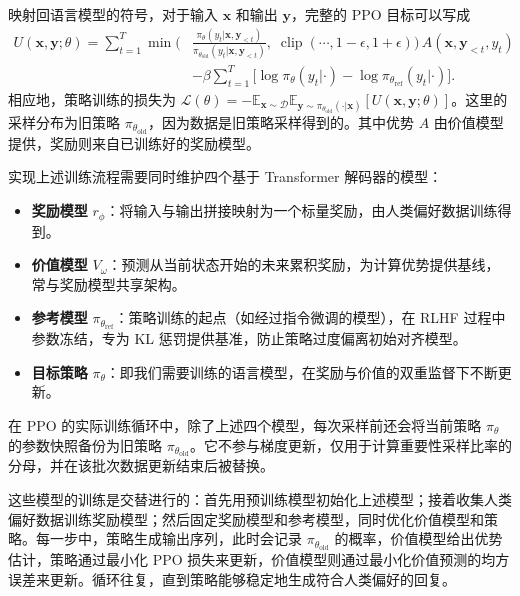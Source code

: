 \documentclass{article}
\begin{document}
映射回语言模型的符号，对于输入 \(\mathbf{x}\) 和输出 \(\mathbf{y}\)，完整的 PPO 目标可以写成
\begin{align}
U(\mathbf{x},\mathbf{y};\theta) = \sum_{t=1}^{T} \min\Big(&\frac{\pi_{\theta}(y_t|\mathbf{x},\mathbf{y}_{<t})}{\pi_{\theta_{\mathrm{old}}}(y_t|\mathbf{x},\mathbf{y}_{<t})},\;
\operatorname{clip}(\cdots, 1-\epsilon, 1+\epsilon)\Big)\,A(\mathbf{x},\mathbf{y}_{<t},y_t) \nonumber \\
&- \beta\sum_{t=1}^{T}\bigl[\log \pi_{\theta}(y_t|\cdot) - \log \pi_{\theta_{\mathrm{ref}}}(y_t|\cdot)\bigr].
\end{align}
相应地，策略训练的损失为 \(\mathcal{L}(\theta) = -\mathbb{E}_{\mathbf{x}\sim\mathcal{D}}\mathbb{E}_{\mathbf{y}\sim\pi_{\theta_{\mathrm{old}}}(\cdot|\mathbf{x})}[U(\mathbf{x},\mathbf{y};\theta)]\)。这里的采样分布为旧策略 \(\pi_{\theta_{\mathrm{old}}}\)，因为数据是旧策略采样得到的。其中优势 \(A\) 由价值模型提供，奖励则来自已训练好的奖励模型。

实现上述训练流程需要同时维护四个基于 Transformer 解码器的模型：
\begin{itemize}
\item \textbf{奖励模型} \(r_{\phi}\)：将输入与输出拼接映射为一个标量奖励，由人类偏好数据训练得到。
\item \textbf{价值模型} \(V_{\omega}\)：预测从当前状态开始的未来累积奖励，为计算优势提供基线，常与奖励模型共享架构。
\item \textbf{参考模型} \(\pi_{\theta_{\mathrm{ref}}}\)：策略训练的起点（如经过指令微调的模型），在 RLHF 过程中参数冻结，专为 KL 惩罚提供基准，防止策略过度偏离初始对齐模型。
\item \textbf{目标策略} \(\pi_{\theta}\)：即我们需要训练的语言模型，在奖励与价值的双重监督下不断更新。
\end{itemize}
在 PPO 的实际训练循环中，除了上述四个模型，每次采样前还会将当前策略 \(\pi_{\theta}\) 的参数快照备份为旧策略 \(\pi_{\theta_{\mathrm{old}}}\)。它不参与梯度更新，仅用于计算重要性采样比率的分母，并在该批次数据更新结束后被替换。

这些模型的训练是交替进行的：首先用预训练模型初始化上述模型；接着收集人类偏好数据训练奖励模型；然后固定奖励模型和参考模型，同时优化价值模型和策略。每一步中，策略生成输出序列，此时会记录 \(\pi_{\theta_{\mathrm{old}}}\) 的概率，价值模型给出优势估计，策略通过最小化 PPO 损失来更新，价值模型则通过最小化价值预测的均方误差来更新。循环往复，直到策略能够稳定地生成符合人类偏好的回复。
\end{document}
